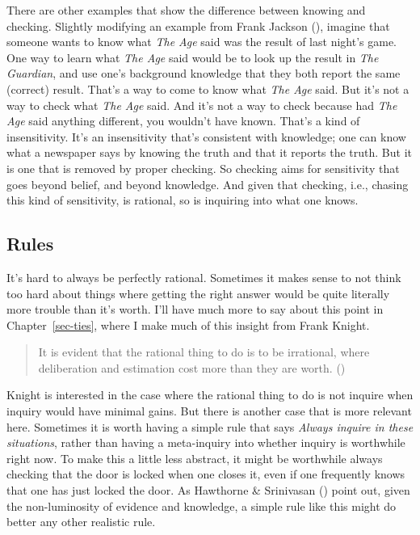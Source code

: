 \documentclass[
  12pt,
  letterpaper,
]{scrbook}
\begin{document}
There are other examples that show the difference between knowing and
checking. Slightly modifying an example from Frank Jackson
(), imagine that someone wants to know
what \emph{The Age} said was the result of last night's game. One way to
learn what \emph{The Age} said would be to look up the result in
\emph{The Guardian}, and use one's background knowledge that they both
report the same (correct) result. That's a way to come to know what
\emph{The Age} said. But it's not a way to check what \emph{The Age}
said. And it's not a way to check because had \emph{The Age} said
anything different, you wouldn't have known. That's a kind of
insensitivity. It's an insensitivity that's consistent with knowledge;
one can know what a newspaper says by knowing the truth and that it
reports the truth. But it is one that is removed by proper checking. So
checking aims for sensitivity that goes beyond belief, and beyond
knowledge. And given that checking, i.e., chasing this kind of
sensitivity, is rational, so is inquiring into what one knows.

\subsection{Rules}\label{sec-rulesinquiry}

It's hard to always be perfectly rational. Sometimes it makes sense to
not think too hard about things where getting the right answer would be
quite literally more trouble than it's worth. I'll have much more to say
about this point in Chapter~\ref{sec-ties}, where I make much of this
insight from Frank Knight.

\begin{quote}
It is evident that the rational thing to do is to be irrational, where
deliberation and estimation cost more than they are worth.
()
\end{quote}

Knight is interested in the case where the rational thing to do is not
inquire when inquiry would have minimal gains. But there is another case
that is more relevant here. Sometimes it is worth having a simple rule
that says \emph{Always inquire in these situations}, rather than having
a meta-inquiry into whether inquiry is worthwhile right now. To make
this a little less abstract, it might be worthwhile always checking that
the door is locked when one closes it, even if one frequently knows that
one has just locked the door. As Hawthorne \& Srinivasan
() point out, given the
non-luminosity of evidence and knowledge, a simple rule like this might
do better any other realistic rule.
\end{document}
